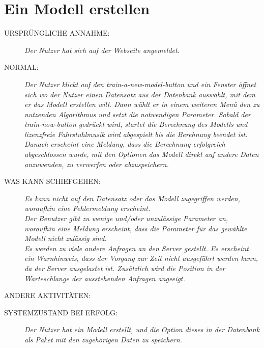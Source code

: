 \section{Ein Modell erstellen}
\begin{description}  
 \item [URSPRÜNGLICHE ANNAHME:]
    \textit{Der Nutzer hat sich auf der Webseite angemeldet.}
  \item [NORMAL:]
    \textit{Der Nutzer klickt auf den train-a-new-model-button und ein Fenster öffnet sich wo der Nutzer einen Datensatz aus der Datenbank auswählt, mit dem er das Modell erstellen will. Dann wählt er in einem weiteren Menü den zu nutzenden Algorithmus und setzt die notwendigen Parameter. Sobald der train-now-button gedrückt wird, startet die Berechnung des Modells und lizenzfreie Fahrstuhlmusik wird abgespielt bis die Berehnung beendet ist. Danach erscheint eine Meldung, dass die Berechnung erfolgreich abgeschlossen wurde, mit den Optionen das Modell direkt auf andere Daten anzuwenden, zu verwerfen oder abzuspeichern.}
  \item [WAS KANN SCHIEFGEHEN:]
    \textit{Es kann nicht auf den Datensatz oder das Modell zugegriffen werden, woraufhin eine Fehlermeldung erscheint.\\
Der Benutzer gibt zu wenige und/oder unzulässige Parameter an, woraufhin eine Meldung erscheint, dass die Parameter für das gewählte Modell nicht zulässig sind.\\
Es werden zu viele andere Anfragen an den Server gestellt. Es erscheint ein Warnhinweis, dass der Vorgang zur Zeit nicht ausgeführt werden kann, da der Server ausgelastet ist. Zusätzlich wird die Position in der Warteschlange der ausstehenden Anfragen angeeigt.
}
  \item [ANDERE AKTIVITÄTEN:]
    \textit{}
  \item [SYSTEMZUSTAND BEI ERFOLG:]
    \textit{Der Nutzer hat ein Modell erstellt, und die Option dieses in der Datenbank als Paket mit den zugehörigen Daten zu speichern.}
\end{description}

